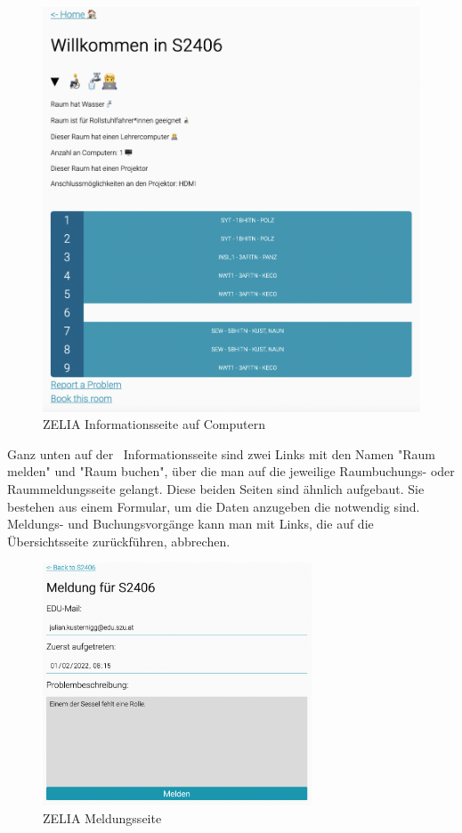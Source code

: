 \begin{figure}[H]
    \centering
    \includegraphics[width=120mm]{media/WebComponents/Rauminformationsseite.png}
    \caption{ZELIA Informationsseite auf Computern}
    \label{fig:zeliainfopage}
\end{figure}

Ganz unten auf der \ZELIA\ Informationsseite sind zwei Links mit den Namen "Raum melden" und "Raum buchen", über die man auf die jeweilige Raumbuchungs- oder Raummeldungsseite gelangt. Diese beiden Seiten sind ähnlich aufgebaut. Sie bestehen aus einem Formular, um die Daten anzugeben die notwendig sind. Meldungs- und Buchungsvorgänge kann man mit Links, die auf die Übersichtsseite zurückführen, abbrechen.

\begin{figure}[H]
    \centering
    \includegraphics[width=80mm]{media/WebComponents/Meldungsseite_light.png}
    \caption{ZELIA Meldungsseite}
    
\end{figure}

